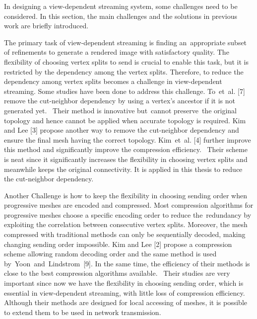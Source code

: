 \documentclass[11pt, a4paper]{report}
\begin{document}
    In designing a view-dependent streaming system, 
    some challenges need to be considered. 
    In this section, the main challenges and the solutions in previous work are briefly introduced.

    The primary task of view-dependent streaming is finding an appropriate subset of refinements
    to generate a rendered image with satisfactory quality. 
    The flexibility of choosing vertex splits to send is crucial to enable this task, 
    but it is restricted by the dependency among the vertex splits. 
    Therefore, to reduce the dependency among vertex splits becomes a challenge in view-dependent streaming. 
    Some studies have been done to address this challenge. 
    To et al. [7] remove the cut-neighbor dependency by using a vertex's ancestor if it is not generated yet. 
    Their method is innovative but cannot preserve the original topology 
    and hence cannot be applied when accurate topology is required. 
    Kim and Lee [3] propose another way to remove the cut-neighbor dependency 
    and ensure the final mesh having the correct topology. 
    Kim et al. [4] further improve this method and significantly improve the compression efficiency. 
     Their scheme is neat since it significantly increases the flexibility in choosing vertex splits
    and meanwhile keeps the original connectivity. 
    It is applied in this thesis to reduce the cut-neighbor dependency.

    Another Challenge is how to keep the flexibility in choosing sending order
    when progressive meshes are encoded and compressed. 
    Most compression algorithms for progressive meshes choose a specific encoding order
    to reduce the redundancy by exploiting the correlation between consecutive vertex splits. 
    Moreover, the mesh compressed with traditional methods can only be sequentially decoded, 
    making changing sending order impossible. 
    Kim and Lee [2] propose a compression scheme allowing random decoding order
    and the same method is used by Yoon and Lindstrom [9]. 
    In the same time, the efficiency of their methods is close to the best compression algorithms available. 
    Their studies are very important since now we have the flexibility in choosing sending order, 
    which is essential in view-dependent streaming, with little loss of compression efficiency. 
    Although their methods are designed for local accessing of meshes, 
    it is possible to extend them to be used in network transmission. 
\end{document}
